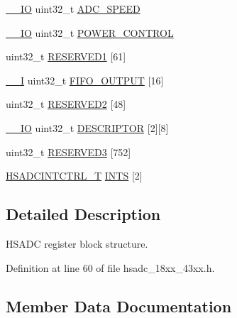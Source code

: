 \begin{DoxyCompactItemize}
\item 
\hyperlink{core__sc300_8h_aec43007d9998a0a0e01faede4133d6be}{\+\_\+\+\_\+\+IO} uint32\+\_\+t \hyperlink{struct_l_p_c___h_s_a_d_c___t_a34833c9bd0e910f7705bac6a2e1abaf0}{A\+D\+C\+\_\+\+S\+P\+E\+ED}
\item 
\hyperlink{core__sc300_8h_aec43007d9998a0a0e01faede4133d6be}{\+\_\+\+\_\+\+IO} uint32\+\_\+t \hyperlink{struct_l_p_c___h_s_a_d_c___t_af3f9764120cd64fd2174abe3428452df}{P\+O\+W\+E\+R\+\_\+\+C\+O\+N\+T\+R\+OL}
\item 
uint32\+\_\+t \hyperlink{struct_l_p_c___h_s_a_d_c___t_a685f4dae563fdfe5b8a4c2e0bc01c55c}{R\+E\+S\+E\+R\+V\+E\+D1} \mbox{[}61\mbox{]}
\item 
\hyperlink{core__sc300_8h_af63697ed9952cc71e1225efe205f6cd3}{\+\_\+\+\_\+I} uint32\+\_\+t \hyperlink{struct_l_p_c___h_s_a_d_c___t_ab199798a386b81cfb9293e32378cdea4}{F\+I\+F\+O\+\_\+\+O\+U\+T\+P\+UT} \mbox{[}16\mbox{]}
\item 
uint32\+\_\+t \hyperlink{struct_l_p_c___h_s_a_d_c___t_ad9fc48d7442bcae54fdd0d76fdd0cd02}{R\+E\+S\+E\+R\+V\+E\+D2} \mbox{[}48\mbox{]}
\item 
\hyperlink{core__sc300_8h_aec43007d9998a0a0e01faede4133d6be}{\+\_\+\+\_\+\+IO} uint32\+\_\+t \hyperlink{struct_l_p_c___h_s_a_d_c___t_acf8c80fd828a7907acbbc3d2343f6ad9}{D\+E\+S\+C\+R\+I\+P\+T\+OR} \mbox{[}2\mbox{]}\mbox{[}8\mbox{]}
\item 
uint32\+\_\+t \hyperlink{struct_l_p_c___h_s_a_d_c___t_a5f7633908420d54f6c49e6d226152833}{R\+E\+S\+E\+R\+V\+E\+D3} \mbox{[}752\mbox{]}
\item 
\hyperlink{struct_h_s_a_d_c_i_n_t_c_t_r_l___t}{H\+S\+A\+D\+C\+I\+N\+T\+C\+T\+R\+L\+\_\+T} \hyperlink{struct_l_p_c___h_s_a_d_c___t_a19b73c8096d8dfbd629cb74077b5aeb6}{I\+N\+TS} \mbox{[}2\mbox{]}
\end{DoxyCompactItemize}


\subsection{Detailed Description}
H\+S\+A\+DC register block structure. 

Definition at line 60 of file hsadc\+\_\+18xx\+\_\+43xx.\+h.



\subsection{Member Data Documentation}
\mbox{\label{struct_l_p_c___h_s_a_d_c___t_a34833c9bd0e910f7705bac6a2e1abaf0}} 
